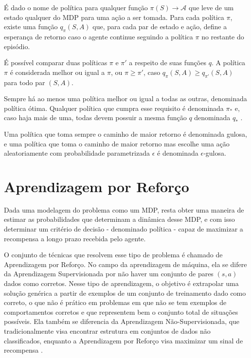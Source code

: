 É dado o nome de política para qualquer função $\pi(S) \to \mathcal{A}$ que leve de um estado qualquer do MDP para uma ação a ser tomada. Para cada política $\pi$, existe uma função $q_\pi(S, A)$ que, para cada par de estado e ação, define a esperança de retorno caso o agente continue seguindo a política $\pi$ no restante do episódio.

É possível comparar duas políticas $\pi$ e $\pi'$ a respeito de suas funções $q$. A política $\pi$ é considerada melhor ou igual a $\pi$, ou $\pi \ge \pi'$, caso $q_\pi(S, A) \ge q_{\pi'}(S, A)$ para todo par $(S, A)$.

Sempre há ao menos uma política melhor ou igual a todas as outras, denominada política ótima. Qualquer política que cumpra esse requisito é denominada $\pi_*$ e, caso haja mais de uma, todas devem possuir a mesma função $q$ denominada $q_*$ \cite{sutton2018reinforcement}. %

Uma política que toma sempre o caminho de maior retorno é denominada gulosa, e uma política que toma o caminho de maior retorno mas escolhe uma ação aleatoriamente com probabilidade parametrizada $\epsilon$ é denominada $\epsilon$-gulosa.

\section{Aprendizagem por Reforço}

Dada uma modelagem do problema como um MDP, resta obter uma maneira de estimar as probabilidades que determinam a dinâmica desse MDP, e com isso determinar um critério de decisão - denominado política - capaz de maximizar a recompensa a longo prazo recebida pelo agente.

O conjunto de técnicas que resolvem esse tipo de problema é chamado de Aprendizagem por Reforço.
No campo da aprendizagem de máquina, ela se difere da Aprendizagem Supervisionada por não haver um conjunto de pares $(s, a)$ dados como corretos.
Nesse tipo de aprendizagem, o objetivo é extrapolar uma solução genérica a partir de exemplos de um conjunto de treinamento dado como correto, o que não é prático em problemas em que não se tem exemplos de comportamentos corretos e que representem bem o conjunto total de situações possíveis.
Ela também se diferencia da Aprendizagem Não-Supervisionada, que tradicionalmente visa encontrar estrutura em conjuntos de dados não classificados, enquanto a Aprendizagem por Reforço visa maximizar um sinal de recompensa \cite{sutton2018reinforcement}.

